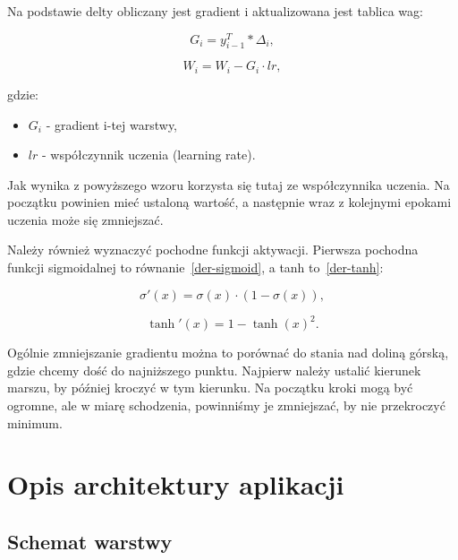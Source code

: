    Na podstawie delty obliczany jest gradient i aktualizowana jest tablica wag:

    \begin{equation}
        G_i = y_{i-1}^T * \Delta_i,
    \end{equation}

    \begin{equation}
        W_i = W_i - G_i \cdot lr,
    \end{equation}

    gdzie:
    \begin{itemize}
        \item $G_i$ - gradient i-tej warstwy,
        \item $lr$ - współczynnik uczenia (learning rate).
    \end{itemize}

    Jak wynika z powyższego wzoru korzysta się tutaj ze współczynnika uczenia.
    Na początku powinien mieć ustaloną wartość, a następnie wraz z kolejnymi epokami uczenia może się zmniejszać.

    Należy również wyznaczyć pochodne funkcji aktywacji.
    Pierwsza pochodna funkcji sigmoidalnej to równanie~\ref{der-sigmoid}, a tanh to~\ref{der-tanh}:

    \begin{equation}
        \sigma'(x) = \sigma(x) \cdot (1 - \sigma(x)),
        \label{der-sigmoid}
    \end{equation}

    \begin{equation}
        \tanh'(x) = 1 - \tanh(x)^2.
        \label{der-tanh}
    \end{equation}

    Ogólnie zmniejszanie gradientu można to porównać do stania nad doliną górską, gdzie chcemy dość do najniższego punktu.
    Najpierw należy ustalić kierunek marszu, by później kroczyć w tym kierunku.
    Na początku kroki mogą być ogromne, ale w miarę schodzenia, powinniśmy je zmniejszać, by nie przekroczyć minimum.

    \chapter{Opis architektury aplikacji}\label{ch:opisArchitekturyAplikacji}

    \section{Schemat warstwy}\label{sec:schematWarstwy}


